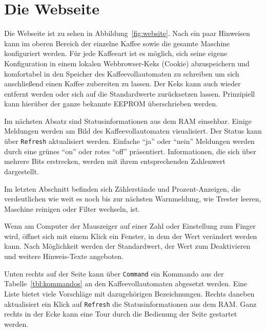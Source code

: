 \section{Die Webseite}

Die Webseite ist zu sehen in Abbildung~\ref{fig:website}.
Nach ein paar Hinweisen kann im oberen Bereich der einzelne Kaffee sowie die gesamte Maschine konfiguriert werden.
Für jede Kaffeeart ist es möglich, sich seine eigene Konfiguration in einem lokalen Webbrowser-Keks (Cookie) abzuspeichern und komfortabel in den Speicher des Kaffeevollautomaten zu schreiben um sich anschließend einen Kaffee zubereiten zu lassen.
Der Keks kann auch wieder entfernt werden oder sich auf die Standardwerte zurücksetzen lassen.
Prinzipiell kann hierüber der ganze bekannte \ac{EEPROM} überschrieben werden.

Im nächsten Absatz sind Statusinformationen aus dem \ac{RAM} einsehbar.
Einige Meldungen werden am Bild des Kaffeevollautomaten visualisiert.
Der Status kann über \texttt{Refresh} aktualisiert werden.
Einfache "`ja"' oder "`nein"' Meldungen werden durch eine grünes "`on"' oder rotes "`off"' präsentiert.
Informationen, die sich über mehrere Bits erstrecken, werden mit ihrem entsprechenden Zahlenwert dargestellt.

Im letzten Abschnitt befinden sich Zählerstände und Prozent-Anzeigen, die verdeutlichen wie weit es noch bis zur nächsten Warnmeldung, wie Trester leeren, Maschine reinigen oder Filter wechseln, ist.

Wenn am Computer der Mauszeiger auf einer Zahl oder Einstellung zum Finger wird, öffnet sich mit einem Klick ein Fenster, in dem der Wert verändert werden kann.
Nach Möglichkeit werden der Standardwert, der Wert zum Deaktivieren und weitere Hinweis-Texte angeboten.

Unten rechts auf der Seite kann über \texttt{Command} ein Kommando aus der Tabelle~\ref{tbl:kommandos} an den Kaffeevollautomaten abgesetzt werden.
Eine Liste bietet viele Vorschläge mit dazugehörigen Bezeichnungen.
Rechts daneben aktualisiert ein Klick auf \texttt{Refresh} die Statusinformationen aus dem \ac{RAM}.
Ganz rechts in der Ecke kann eine Tour durch die Bedienung der Seite gestartet werden.

